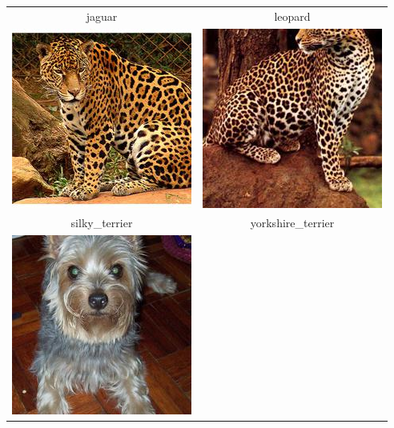 \documentclass{article}
\begin{document}
\begin{table}[]
    \centering
    \begin{tabular}{|c c|}
    \hline
    jaguar   &  leopard\\
    \begin{minipage}{.4\linewidth}
    \centering
      \includegraphics[width=.6\linewidth]{pairs/jaguar.JPEG}
    \end{minipage}     & 
    \begin{minipage}{.4\linewidth}
    \centering
      \includegraphics[width=.6\linewidth]{pairs/leopard.JPEG}
    \end{minipage}\\
        \hline
    silky\_terrier   &  yorkshire\_terrier\\
    \begin{minipage}{.4\linewidth}
    \centering
      \includegraphics[width=.6\linewidth]{pairs/silky_terrier.JPEG}

\end{minipage}
\end{tabular}
\end{table}
\end{document}
